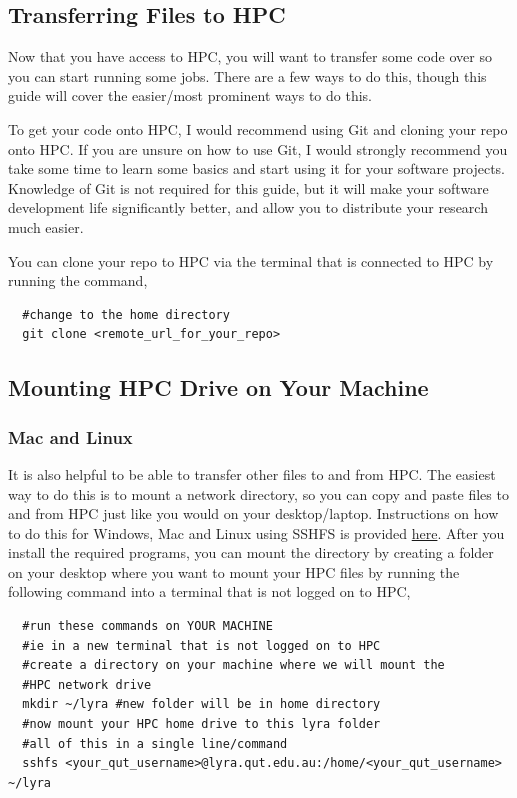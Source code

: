 \subsection{Transferring Files to HPC}
Now that you have access to HPC, you will want to transfer some code over so you can start running some jobs. There are a few ways to do this, though this guide will cover the easier/most prominent ways to do this.
%
%
\par
%
%
To get your code onto HPC, I would recommend using Git and cloning your repo onto HPC. If you are unsure on how to use Git, I would strongly recommend you take some time to learn some basics and start using it for your software projects. Knowledge of Git is not required for this guide, but it will make your software development life significantly better, and allow you to distribute your research much easier.
%
%
\par
%
%
You can clone your repo to HPC via the terminal that is connected to HPC by running the command,
\\
\par
\begin{verbatim}
  #change to the home directory
  git clone <remote_url_for_your_repo>
\end{verbatim}
%
%
\subsection{Mounting HPC Drive on Your Machine}
\subsubsection{Mac and Linux}
It is also helpful to be able to transfer other files to and from HPC. The easiest way to do this is to mount a network directory, so you can copy and paste files to and from HPC just like you would on your desktop/laptop. Instructions on how to do this for Windows, Mac and Linux using SSHFS is provided \href{https://www.digitalocean.com/community/tutorials/how-to-use-sshfs-to-mount-remote-file-systems-over-ssh}{here}. After you install the required programs, you can mount the directory by creating a folder on your desktop where you want to mount your HPC files by running the following command into a terminal that is not logged on to HPC,
%
%
\\
\par
\begin{verbatim}
  #run these commands on YOUR MACHINE
  #ie in a new terminal that is not logged on to HPC
  #create a directory on your machine where we will mount the
  #HPC network drive
  mkdir ~/lyra #new folder will be in home directory
  #now mount your HPC home drive to this lyra folder
  #all of this in a single line/command
  sshfs <your_qut_username>@lyra.qut.edu.au:/home/<your_qut_username> ~/lyra
\end{verbatim}
% 
%
%
\par
%
%
